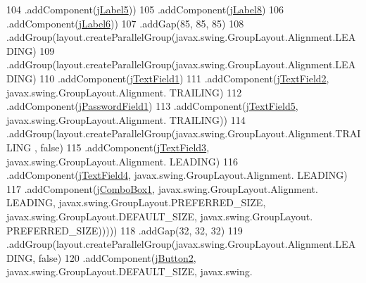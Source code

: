 \begin{DoxyCode}
104                                 .addComponent(\mbox{\hyperlink{class_interfaz_package_1_1_interfaz_registro_a33ae73ec9abbf6e97467d9260b162c3e}{jLabel5}}))
105                             .addComponent(\mbox{\hyperlink{class_interfaz_package_1_1_interfaz_registro_ab71462c00d6d77761293a3876adb4447}{jLabel8}})
106                             .addComponent(\mbox{\hyperlink{class_interfaz_package_1_1_interfaz_registro_a49a5d1a1190e2cef3163a9b00fa76108}{jLabel6}}))
107                         .addGap(85, 85, 85)
108                         .addGroup(layout.createParallelGroup(javax.swing.GroupLayout.Alignment.LEADING)
109                             .addGroup(layout.createParallelGroup(javax.swing.GroupLayout.Alignment.LEADING)
110                                 .addComponent(\mbox{\hyperlink{class_interfaz_package_1_1_interfaz_registro_a19ed9a68b571a55582801c1726af9b06}{jTextField1}})
111                                 .addComponent(\mbox{\hyperlink{class_interfaz_package_1_1_interfaz_registro_a999435bfad451715c3e32330d21be7bb}{jTextField2}}, javax.swing.GroupLayout.Alignment.
      TRAILING)
112                                 .addComponent(\mbox{\hyperlink{class_interfaz_package_1_1_interfaz_registro_af5d680c6a043e4e0a96fa3b93ad17cf0}{jPasswordField1}})
113                                 .addComponent(\mbox{\hyperlink{class_interfaz_package_1_1_interfaz_registro_ad0d4eb99969584d92b6b857ad190d210}{jTextField5}}, javax.swing.GroupLayout.Alignment.
      TRAILING))
114                             .addGroup(layout.createParallelGroup(javax.swing.GroupLayout.Alignment.TRAILING
      , \textcolor{keyword}{false})
115                                 .addComponent(\mbox{\hyperlink{class_interfaz_package_1_1_interfaz_registro_a053413f2ec138bbb7914f22521b998f2}{jTextField3}}, javax.swing.GroupLayout.Alignment.
      LEADING)
116                                 .addComponent(\mbox{\hyperlink{class_interfaz_package_1_1_interfaz_registro_ac390d7bd629d29d59202c8b4fd60f46c}{jTextField4}}, javax.swing.GroupLayout.Alignment.
      LEADING)
117                                 .addComponent(\mbox{\hyperlink{class_interfaz_package_1_1_interfaz_registro_a4c0ea8d0c8cbb3225b39b115bbd0416b}{jComboBox1}}, javax.swing.GroupLayout.Alignment.
      LEADING, javax.swing.GroupLayout.PREFERRED\_SIZE, javax.swing.GroupLayout.DEFAULT\_SIZE, javax.swing.GroupLayout.
      PREFERRED\_SIZE)))))
118                 .addGap(32, 32, 32)
119                 .addGroup(layout.createParallelGroup(javax.swing.GroupLayout.Alignment.LEADING, \textcolor{keyword}{false})
120                     .addComponent(\mbox{\hyperlink{class_interfaz_package_1_1_interfaz_registro_aece6fd600c53e99fc2b9de62cfcbc0ae}{jButton2}}, javax.swing.GroupLayout.DEFAULT\_SIZE, javax.swing.

\end{DoxyCode}
